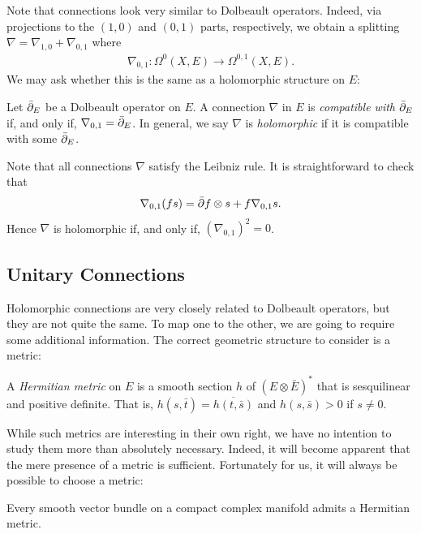 \documentclass[12pt]{ociamthesis}  %
\begin{document}
Note that connections look very similar to Dolbeault operators.
Indeed, via projections to the $(1,0)$ and $(0,1)$ parts, respectively,
we obtain a splitting $\nabla = \nabla_{1,0} + \nabla_{0,1}$
where
\begin{align*}
  \nabla_{0,1} : \Omega^0(X,E) \to \Omega^{0,1}(X,E).
\end{align*}
We may ask whether this is the same as a holomorphic structure on $E$:

\begin{definition}
  Let ${\bar{\partial}}_E$ be a Dolbeault operator on $E$.
  A connection $\nabla$ in $E$ is \emph{compatible with ${\bar{\partial}}_E$}
  if, and only if, $\nabla_{0,1} = {\bar{\partial}}_E$. In general, we say
  $\nabla$ is \emph{holomorphic} if it is compatible with some
  ${\bar{\partial}}_E$.
\end{definition}

Note that all connections $\nabla$ satisfy the Leibniz rule. It is
straightforward to check that
\begin{align*}
  \nabla_{0,1} (fs) = {\bar{\partial}} f\otimes s + f \nabla_{0,1} s.
\end{align*}
Hence $\nabla$ is holomorphic if, and only if, $(\nabla_{0,1})^2 = 0$.

\subsection{Unitary Connections}

Holomorphic connections are very closely related to Dolbeault operators,
but they are not quite the same. To map one to the other, we are going
to require some additional information. The correct geometric
structure to consider is a metric:

\begin{definition}
  A \emph{Hermitian metric} on $E$ is a smooth section $h$ of
  $(E\otimes\bar E)^*$ that is sesquilinear and positive definite.
  That is, $h(s,\bar t) = \overline{h(t,\bar s)}$ and $h(s,\bar s) > 0$
  if $s \neq 0$.
\end{definition}

While such metrics are interesting in their own right, we have no
intention to study them more than absolutely necessary. Indeed, it will
become apparent that the mere presence of a metric is sufficient.
Fortunately for us, it will always be possible to choose a metric:

\begin{theorem}\label{thm:hermitian_structures_exist}\missingcitation
  Every smooth vector bundle on a compact complex manifold admits a
  Hermitian metric.
\end{theorem}
\end{document}
